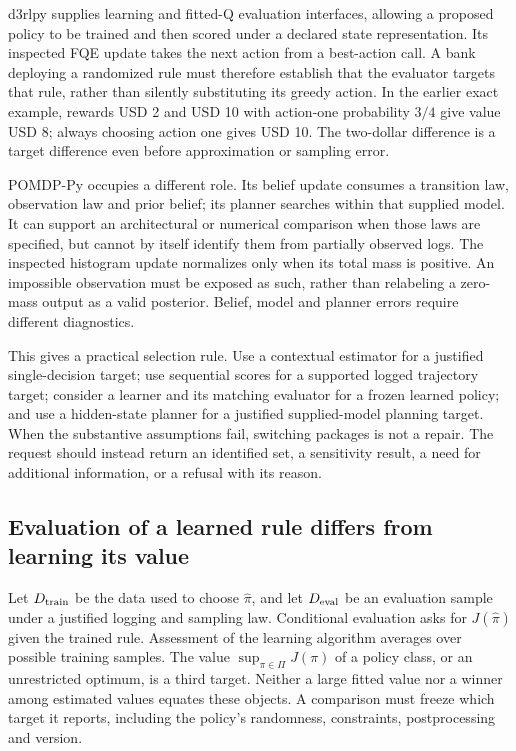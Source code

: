 d3rlpy supplies learning and fitted-Q evaluation interfaces, allowing a proposed
policy to be trained and then scored under a declared state representation.
Its inspected FQE update takes the next action from a best-action call. A bank
deploying a randomized rule must therefore establish that the evaluator targets
that rule, rather than silently substituting its greedy action. In the earlier
exact example, rewards USD 2 and USD 10 with action-one probability $3/4$ give
value USD 8; always choosing action one gives USD 10. The two-dollar difference
is a target difference even before approximation or sampling error.
\citep{exec15_d3rlpy_value,exec15_d3rlpy_exact}

POMDP-Py occupies a different role. Its belief update consumes a transition law,
observation law and prior belief; its planner searches within that supplied
model. It can support an architectural or numerical comparison when those laws
are specified, but cannot by itself identify them from partially observed logs.
The inspected histogram update normalizes only when its total mass is positive.
An impossible observation must be exposed as such, rather than relabeling a
zero-mass output as a valid posterior. Belief, model and planner errors require
different diagnostics.~\citep{exec23_pomdppy_sources}

This gives a practical selection rule. Use a contextual estimator for a justified
single-decision target; use sequential scores for a supported logged trajectory
target; consider a learner and its matching evaluator for a frozen learned policy;
and use a hidden-state planner for a justified supplied-model planning target.
When the substantive assumptions fail, switching packages is not a repair. The
request should instead return an identified set, a sensitivity result, a need for
additional information, or a refusal with its reason.

\subsection{Evaluation of a learned rule differs from learning its value}

Let $D_{\rm train}$ be the data used to choose $\widehat\pi$, and let
$D_{\rm eval}$ be an evaluation sample under a justified logging and sampling law.
Conditional evaluation asks for $J(\widehat\pi)$ given the trained rule. Assessment
of the learning algorithm averages over possible training samples. The value
$\sup_{\pi\in\Pi}J(\pi)$ of a policy class, or an unrestricted optimum, is a third
target. Neither a large fitted value nor a winner among estimated values equates
these objects. A comparison must freeze which target it reports, including the
policy's randomness, constraints, postprocessing and version.

